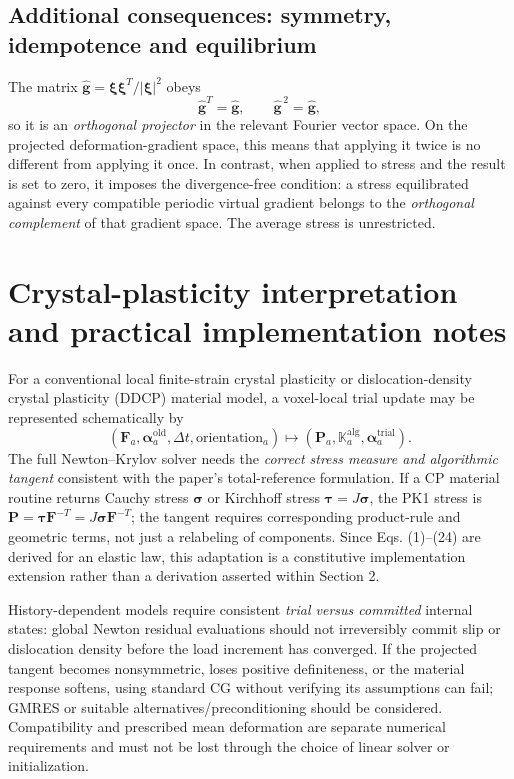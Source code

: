 \documentclass[11pt,a4paper]{article}
\numberwithin{equation}{section}
\newcommand{\F}{\mathbf F}
\newcommand{\Pstress}{\mathbf P}
\newcommand{\Kop}{\mathbb K}
\begin{document}
\subsection{Additional consequences: symmetry, idempotence and equilibrium}
The matrix $\hat{\mathbf g}=\bm\xi\bm\xi^T/|\bm\xi|^2$ obeys
\[
\hat{\mathbf g}^T=\hat{\mathbf g},\qquad
\hat{\mathbf g}^{\,2}=\hat{\mathbf g},
\]
so it is an \emph{orthogonal projector} in the relevant Fourier vector space. On the projected deformation-gradient space, this means that applying it twice is no different from applying it once. In contrast, when applied to stress and the result is set to zero, it imposes the divergence-free condition: a stress equilibrated against every compatible periodic virtual gradient belongs to the \emph{orthogonal complement} of that gradient space. The average stress is unrestricted.

\section{Crystal-plasticity interpretation and practical implementation notes}
For a conventional local finite-strain crystal plasticity or dislocation-density crystal plasticity (DDCP) material model, a voxel-local trial update may be represented schematically by
\[
(\F_a,\bm\alpha_a^{\mathrm{old}},\Delta t,\text{orientation}_a)
\longmapsto
(\Pstress_a,\Kop_a^{\mathrm{alg}},\bm\alpha_a^{\mathrm{trial}}).
\]
The full Newton--Krylov solver needs the \emph{correct stress measure and algorithmic tangent} consistent with the paper's total-reference formulation. If a CP material routine returns Cauchy stress $\bm\sigma$ or Kirchhoff stress $\bm\tau=J\bm\sigma$, the PK1 stress is $\Pstress=\bm\tau\F^{-T}=J\bm\sigma\F^{-T}$; the tangent requires corresponding product-rule and geometric terms, not just a relabeling of components. Since Eqs. (1)--(24) are derived for an elastic law, this adaptation is a constitutive implementation extension rather than a derivation asserted within Section 2.

History-dependent models require consistent \emph{trial versus committed} internal states: global Newton residual evaluations should not irreversibly commit slip or dislocation density before the load increment has converged. If the projected tangent becomes nonsymmetric, loses positive definiteness, or the material response softens, using standard CG without verifying its assumptions can fail; GMRES or suitable alternatives/preconditioning should be considered. Compatibility and prescribed mean deformation are separate numerical requirements and must not be lost through the choice of linear solver or initialization.
\end{document}

